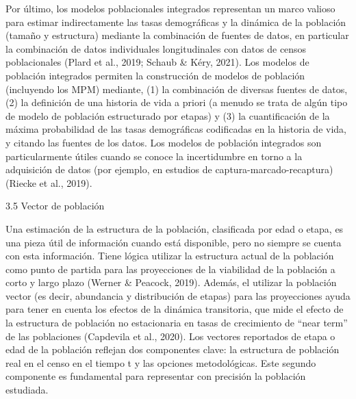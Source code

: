 \documentclass[
  12pt,
  letterpaper,
]{book}
\begin{document}
Por último, los modelos poblacionales integrados representan un marco
valioso para estimar indirectamente las tasas demográficas y la dinámica
de la población (tamaño y estructura) mediante la combinación de fuentes
de datos, en particular la combinación de datos individuales
longitudinales con datos de censos poblacionales (Plard et al., 2019;
Schaub \& Kéry, 2021). Los modelos de población integrados permiten la
construcción de modelos de población (incluyendo los MPM) mediante, (1)
la combinación de diversas fuentes de datos, (2) la definición de una
historia de vida a priori (a menudo se trata de algún tipo de modelo de
población estructurado por etapas) y (3) la cuantificación de la máxima
probabilidad de las tasas demográficas codificadas en la historia de
vida, y citando las fuentes de los datos. Los modelos de población
integrados son particularmente útiles cuando se conoce la incertidumbre
en torno a la adquisición de datos (por ejemplo, en estudios de
captura-marcado-recaptura) (Riecke et al., 2019).

3.5 \textbar{} Vector de población

Una estimación de la estructura de la población, clasificada por edad o
etapa, es una pieza útil de información cuando está disponible, pero no
siempre se cuenta con esta información. Tiene lógica utilizar la
estructura actual de la población como punto de partida para las
proyecciones de la viabilidad de la población a corto y largo plazo
(Werner \& Peacock, 2019). Además, el utilizar la población vector (es
decir, abundancia y distribución de etapas) para las proyecciones ayuda
para tener en cuenta los efectos de la dinámica transitoria, que mide el
efecto de la estructura de población no estacionaria en tasas de
crecimiento de ``near term'' de las poblaciones (Capdevila et al.,
2020). Los vectores reportados de etapa o edad de la población reflejan
dos componentes clave: la estructura de población real en el censo en el
tiempo t y las opciones metodológicas. Este segundo componente es
fundamental para representar con precisión la población estudiada.
\end{document}
